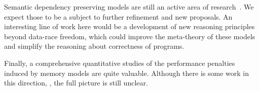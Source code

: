 Semantic dependency preserving models are still an active 
area of research~\cite{Kang-al:POPL17, Lee-al:PLDI20, Cho-al:PLDI21,
Chakraborty-Vafeiadis:POPL19, Paviotti-al:ESOP20, 
Jagadeesan-al:OOPSLA2020}. 
We expect those to be a subject to 
further refinement and new proposals. 
An interesting line of work here would be 
a development of new reasoning principles
beyond data-race freedom, which could 
improve the meta-theory of these models and 
simplify the reasoning about correctness of programs.   

Finally, a comprehensive quantitative studies 
of the performance penalties induced by memory models are quite valuable.
Although there is some work in this direction,%
\cite{Singh-al:ISCA12, Liu-al:OOPSLA17, Liu-al:PLDI19, 
Vollmer-al:PPoPP17, Dolan-al:PLDI18, Ou-Demsky:OOPSLA18}, 
the full picture is still unclear.
